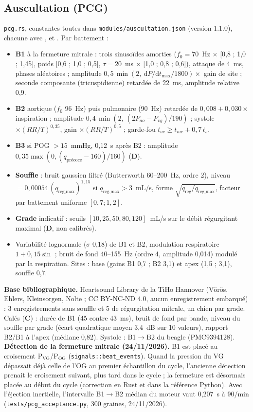 \documentclass[10pt,a4paper]{article}
\newcommand{\cmd}[1]{\texttt{#1}}
\newcommand{\vp}[1]{\text{\texttt{\detokenize{#1}}}}
\newcommand{\evC}{\textcolor{orange!80!black}{\textbf{C}}}
\newcommand{\evD}{\textcolor{red!70!black}{\textbf{D}}}
\newcommand{\sources}[1]{\par\textbf{Base bibliographique.} #1}
\begin{document}
\subsection{Auscultation (PCG)}
\cmd{pcg.rs}, constantes toutes dans \cmd{modules/auscultation.json} (version 1.1.0), chacune avec \vp{source}, \vp{evidence} et \vp{calibre_sur}. Par battement :
\begin{itemize}
\item \textbf{B1} à la fermeture mitrale : trois sinusoïdes amorties ($f_0 = 70$~Hz $\times$ [0,8 ; 1,0 ; 1,45], poids [0,6 ; 1,0 ; 0,5], $\tau = 20$~ms $\times$ [1,0 ; 0,8 ; 0,6]), attaque de 4~ms, phases aléatoires ; amplitude $0{,}5\,\min(2,\ \text{d}P/\text{d}t_\text{max}/1800)\times$ gain de site ; seconde composante (tricuspidienne) retardée de 22~ms, amplitude relative 0,9.
\item \textbf{B2} aortique ($f_0$ 96~Hz) puis pulmonaire (90~Hz) retardée de $0{,}008 + 0{,}030\times$inspiration ; amplitude $0{,}4\,\min(2,\ (2P_{ao} - P_{vg})/190)$ ; systole $\times (RR/T)^{0{,}35}$, gain $\times (RR/T)^{0{,}5}$ ; garde-fou $t_{ac} \ge t_{mc} + 0{,}7\,t_s$.
\item \textbf{B3} si POG $> 15$~mmHg, 0,12~s après B2 : amplitude $0{,}35\max(0, (q_\text{précoce} - 160)/160)$ (\evD{}).
\item \textbf{Souffle} : bruit gaussien filtré (Butterworth 60--200~Hz, ordre 2), niveau $= 0{,}00054\,(q_\text{reg,max})^{1{,}15}$ si $q_\text{reg,max} > 3$~mL/s, forme $\sqrt{q_\text{reg}/q_\text{reg,max}}$, facteur par battement uniforme $[0{,}7; 1{,}2]$.
\item \textbf{Grade} indicatif : seuils $[10, 25, 50, 80, 120]$~mL/s sur le débit régurgitant maximal (\evD{}, non calibrés).
\item Variabilité lognormale ($\sigma$ 0,18) de B1 et B2, modulation respiratoire $1 + 0{,}15\sin$ ; bruit de fond 40--155~Hz (ordre 4, amplitude 0,014) modulé par la respiration. Sites : base (gains B1 0,7 ; B2 3,1) et apex (1,5 ; 3,1), souffle 0,7.
\end{itemize}
\sources{Heartsound Library de la TiHo Hannover (Vörös, Ehlers, Kleinsorgen, Nolte ; CC BY-NC-ND 4.0, aucun enregistrement embarqué) : 3 enregistrements sans souffle et 5 de régurgitation mitrale, un chien par grade. Calés (\evC{}) : durée de B1 (45 contre 43~ms), bruit de fond par bande, niveau du souffle par grade (écart quadratique moyen 3,4~dB sur 10 valeurs), rapport B2/B1 à l'apex (médiane 0,82). Systole : B1$\to$B2 du beagle (PMC9394128).}
\textbf{Détection de la fermeture mitrale (24/11/2026).} B1 est placé au croisement P$_\text{VG}$/P$_\text{OG}$ (\cmd{signals::beat\_events}). Quand la pression du VG dépassait déjà celle de l'OG au premier échantillon du cycle, l'ancienne détection prenait le croisement suivant, plus tard dans le cycle ; la fermeture est désormais placée au début du cycle (correction en Rust et dans la référence Python). Avec l'éjection inertielle, l'intervalle B1$\to$B2 médian du moteur vaut 0,207~s à 90/min (\cmd{tests/pcg\_acceptance.py}, 300 graines, 24/11/2026).
\end{document}
